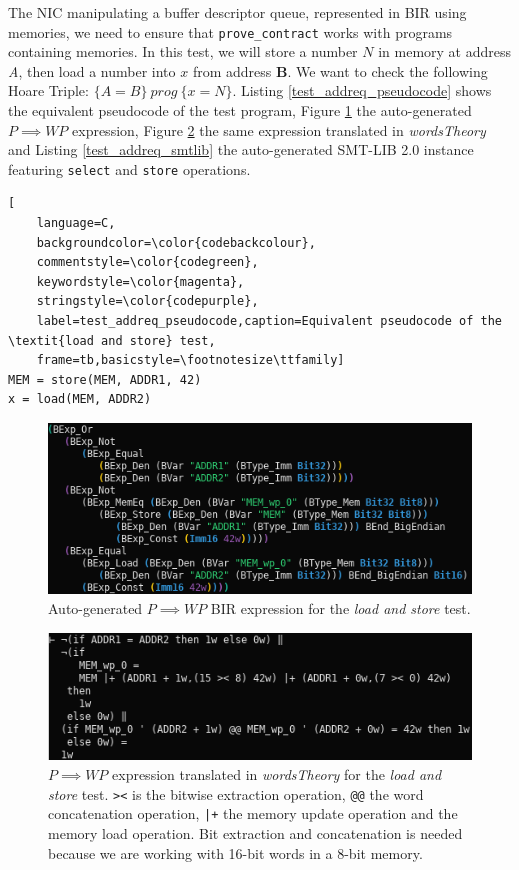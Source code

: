 \documentclass{kththesis}
\newcommand{\htriple}[3]{\ensuremath{\{#1\}~#2~\{#3\}}}
\newcommand{\WP}{\ensuremath{\mathit{WP}}}
\begin{document}
{The \gls{NIC} manipulating a buffer descriptor queue, represented in BIR using memories, we need to ensure that \texttt{prove\_contract} works with programs containing memories. In this test, we will store a number $N$ in memory at address \textit{A}, then load a number into $x$ from address \textbf{B}. We want to check the following Hoare Triple: \htriple{A=B}{prog}{x=N}. Listing \ref{test_addreq_pseudocode} shows the equivalent pseudocode of the test program, Figure \ref{test_addreq_bir} the auto-generated $P \implies \WP$ expression, Figure \ref{test_addreq_words} the same expression translated in \textit{wordsTheory} and Listing \ref{test_addreq_smtlib} the auto-generated SMT-LIB 2.0 instance featuring \texttt{select} and \texttt{store} operations.

\begin{lstlisting}[
    language=C,
    backgroundcolor=\color{codebackcolour},
    commentstyle=\color{codegreen},
    keywordstyle=\color{magenta},
    stringstyle=\color{codepurple},
    label=test_addreq_pseudocode,caption=Equivalent pseudocode of the \textit{load and store} test,
    frame=tb,basicstyle=\footnotesize\ttfamily]
MEM = store(MEM, ADDR1, 42)
x = load(MEM, ADDR2)
\end{lstlisting}

\begin{figure}[!h]
	\includegraphics[width=\textwidth]{figures/test_addreq_bir.png}
	\centering
	\caption{Auto-generated $P \implies \WP$ BIR expression for the \textit{load and store} test.}
	\label{test_addreq_bir}
\end{figure}

\begin{figure}[!h]
	\includegraphics[width=\textwidth]{figures/test_addreq_words.png}
	\centering
	\caption{$P \implies \WP$ expression translated in \textit{wordsTheory} for the \textit{load and store} test. \texttt{><} is the bitwise extraction operation, \texttt{@@} the word concatenation operation, \texttt{|+} the memory update operation and \texttt{\textquotesingle} the memory load operation. Bit extraction and concatenation is needed because we are working with 16-bit words in a 8-bit memory.}
	\label{test_addreq_words}
\end{figure}

}
\end{document}
